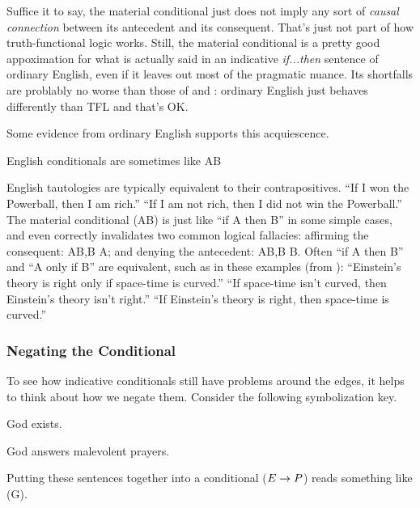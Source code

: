 Suffice it to say, the material conditional just does not imply any sort of
\emph{causal connection} between its antecedent and its consequent. That's just
not part of how truth-functional logic works. Still, the material conditional
is a pretty good appoximation for what is actually said in an indicative
\emph{if...then} sentence of ordinary English, even if it leaves out most of
the pragmatic nuance. Its shortfalls are problably no worse than those of \sand
and \eor: ordinary English just behaves differently than TFL and that's OK.

Some evidence from ordinary English supports this acquiescence.

\begin{observation}[]
  English conditionals are sometimes like A\eif B
  \begin{outline}[enumerate]
    \1 English tautologies are typically equivalent to their
    contrapositives.
    \2 ``If I won the Powerball, then I am rich.''
    \2 ``If I am not rich, then I did not win the Powerball.''
    \1 The material conditional (A\eif B) is just like ``if A then B''
    in some simple cases, and even correctly invalidates two common logical
    fallacies:
    \2 affirming the consequent: A\eif B,B \therefore A; and
    \2 denying the antecedent: A\eif B,\enot B \therefore\enot B.
    \1 Often ``if A then B'' and ``A only if B'' are equivalent, such as in
    these examples (from \cite[][p. 155]{Smi20}):
    \2 ``Einstein's theory is right only if space-time is curved.''
    \2 ``If space-time isn't curved, then Einstein's theory isn't right.''
    \2 ``If Einstein's theory is right, then space-time is curved.''
  \end{outline}
\end{observation}

\subsubsection{Negating the Conditional}

To see how indicative conditionals still have problems around the edges, it
helps to think about how we negate them. Consider the following symbolization
key.

\begin{grayarg}
\item[E:] God exists. 
\item[P:] God answers malevolent prayers.
\end{grayarg}

Putting these sentences together into a conditional ($E\rightarrow P$) reads something
like (G).

